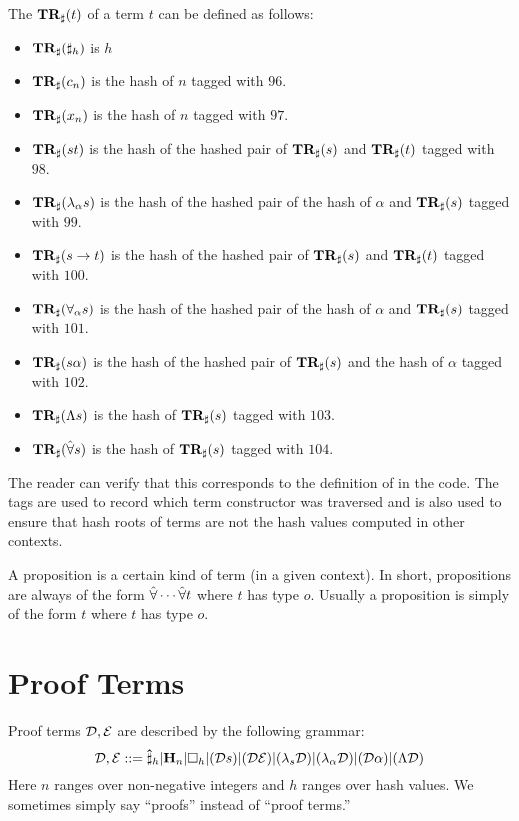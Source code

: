 The {} $\mathbf{TR}_{\sharp}(t)$ of a term $t$ can be defined as follows:
\begin{itemize}
\item $\mathbf{TR}_{\sharp}(\mathbf{\sharp}_{h})$ is $h$
\item $\mathbf{TR}_{\sharp}(c_n)$ is the hash of $n$ tagged with $96$.
\item $\mathbf{TR}_{\sharp}(x_n)$ is the hash of $n$ tagged with $97$.
\item $\mathbf{TR}_{\sharp}(st)$ is the hash of the hashed pair of $\mathbf{TR}_{\sharp}(s)$ and $\mathbf{TR}_{\sharp}(t)$ tagged with $98$.
\item $\mathbf{TR}_{\sharp}(\lambda_\alpha s)$ is the hash of the hashed pair of the hash of $\alpha$ and $\mathbf{TR}_{\sharp}(s)$ tagged with $99$.
\item $\mathbf{TR}_{\sharp}(s\to t)$ is the hash of the hashed pair of $\mathbf{TR}_{\sharp}(s)$ and $\mathbf{TR}_{\sharp}(t)$ tagged with $100$.
\item $\mathbf{TR}_{\sharp}(\forall_\alpha s)$ is the hash of the hashed pair of the hash of $\alpha$ and $\mathbf{TR}_{\sharp}(s)$ tagged with $101$.
\item $\mathbf{TR}_{\sharp}(s\alpha)$ is the hash of the hashed pair of $\mathbf{TR}_{\sharp}(s)$ and the hash of $\alpha$ tagged with $102$.
\item $\mathbf{TR}_{\sharp}(\Lambda s)$ is the hash of $\mathbf{TR}_{\sharp}(s)$ tagged with $103$.
\item $\mathbf{TR}_{\sharp}(\hat{\forall} s)$ is the hash of $\mathbf{TR}_{\sharp}(s)$ tagged with $104$.
\end{itemize}
The reader can verify that this corresponds to the
definition of {} in the code.
The tags are used to record which term constructor was
traversed and is also used to ensure that hash roots
of terms are not the hash values computed in other contexts.

A proposition is a certain kind of term (in a given context).
In short, propositions are always of the form
$\hat{\forall} \cdots \hat{\forall} t$
where $t$ has type $o$.
Usually a proposition is simply of the form
$t$ where $t$ has type $o$.

\section{Proof Terms}

Proof terms $\mathcal{D},\mathcal{E}$ are described by the following grammar:
$$
\mathcal{D},\mathcal{E} ::= \mathbf{\hat\sharp}_{h} | \mathbf{H}_{n} | \Box_{h} | (\mathcal{D} s) | (\mathcal{D} \mathcal{E}) | (\lambda_s \mathcal{D}) | (\lambda_\alpha \mathcal{D}) | (\mathcal{D} \alpha) | (\Lambda \mathcal{D})
$$
Here $n$ ranges over non-negative integers
and $h$ ranges over hash values.
We sometimes simply say ``proofs'' instead of ``proof terms.''

